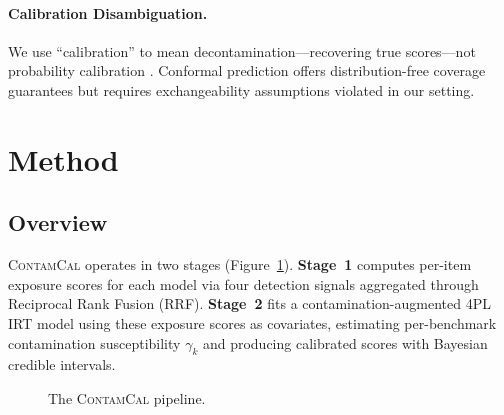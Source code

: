 \documentclass[11pt,a4paper]{article}
\newcommand{\contamcal}{\textsc{ContamCal}}
\begin{document}
\paragraph{Calibration Disambiguation.}
We use ``calibration'' to mean decontamination---recovering true scores---not probability calibration \citep{guo2017calibration,platt1999probabilistic}.
Conformal prediction \citep{angelopoulos2023conformal} offers distribution-free coverage guarantees but requires exchangeability assumptions violated in our setting.

\section{Method}
\label{sec:method}

\subsection{Overview}

\contamcal{} operates in two stages (Figure~\ref{fig:pipeline}).
\textbf{Stage~1} computes per-item exposure scores for each model via four detection signals aggregated through Reciprocal Rank Fusion (RRF).
\textbf{Stage~2} fits a contamination-augmented 4PL IRT model using these exposure scores as covariates, estimating per-benchmark contamination susceptibility $\gamma_k$ and producing calibrated scores with Bayesian credible intervals.

\begin{figure}[t]
\centering
{}
\caption{The \contamcal{} pipeline.}
\label{fig:pipeline}
\end{figure}
\end{document}
